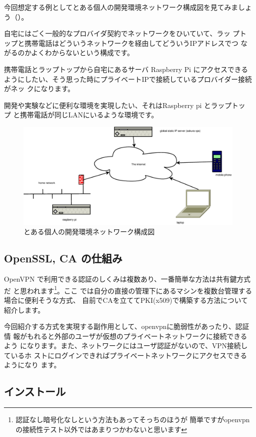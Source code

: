 \documentclass[mingoth,a4paper]{jsarticle}
\begin{document}
今回想定する例としてとある個人の開発環境ネットワーク構成図を見てみましょ
う（）。

自宅にはごく一般的なプロバイダ契約でネットワークをひいていて、ラッ
プトップと携帯電話はどういうネットワークを経由してどういうIPアドレスでつ
ながるのかよくわからないという構成です。

携帯電話とラップトップから自宅にあるサーバ Raspberry Pi にアクセスできる
ようにしたい、そう思った時にプライベートIPで接続しているプロバイダー接続がネッ
クになります。

開発や実験などに便利な環境を実現したい、それはRaspberry pi とラップトップ
と携帯電話が同じLANにいるような環境です。

\begin{figure}[H]
\begin{center}
  \includegraphics[width=0.8\hsize]{image201308/network.eps}
 \caption{とある個人の開発環境ネットワーク構成図}
 \label{fig:network}
\end{center}
\end{figure}

\subsection{OpenSSL, CA の仕組み}

OpenVPN で利用できる認証のしくみは複数あり、一番簡単な方法は共有鍵方式だ
と思われます\footnote{認証なし暗号化なしという方法もあってそっちのほうが
簡単ですがopenvpnの接続性テスト以外ではあまりつかわないと思います}。ここ
では自分の直接の管理下にあるマシンを複数台管理する場合に便利そうな方式、
自前でCAを立ててPKI(x509)で構築する方法について紹介します。

今回紹介する方式を実現する副作用として、openvpnに脆弱性があったり、認証情
報がもれると外部のユーザが仮想のプライベートネットワークに接続できるよう
になります。また、ネットワークにはユーザ認証がないので、VPN接続しているホ
ストにログインできればプライベートネットワークにアクセスできるようになり
ます。

\subsection{インストール}
\end{document}
